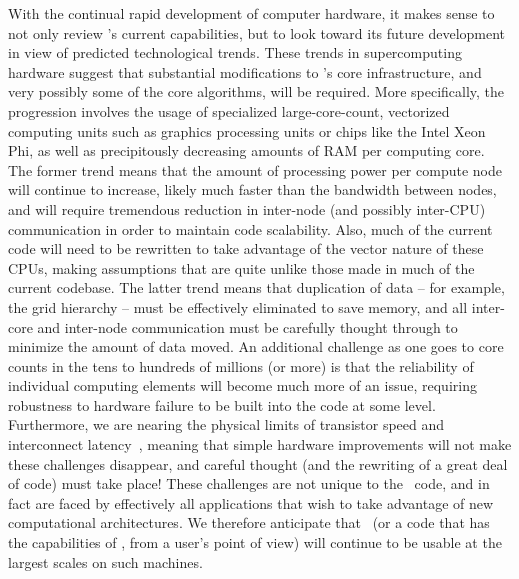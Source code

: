 With the continual rapid development of computer hardware, it makes
sense to not only review \enzo's current capabilities, but to look
toward its future development in view of predicted technological
trends. These trends in supercomputing hardware suggest that
substantial modifications to \enzo's core infrastructure, and very
possibly some of the core algorithms, will be required. More
specifically, the progression involves the usage of specialized
large-core-count, vectorized computing units such as graphics
processing units or chips like the Intel Xeon Phi, as well as
precipitously decreasing amounts of RAM per computing core.  The
former trend means that the amount of processing power per compute
node will continue to increase, likely much faster than the bandwidth
between nodes, and will require tremendous reduction in inter-node
(and possibly inter-CPU) communication in order to maintain code
scalability.  Also, much of the current code will need to be rewritten
to take advantage of the vector nature of these CPUs, making
assumptions that are quite unlike those made in much of the current
codebase.  The latter trend means that duplication of data -- for
example, the grid hierarchy -- must be effectively eliminated to save
memory, and all inter-core and inter-node communication must be
carefully thought through to minimize the amount of data moved.  An
additional challenge as one goes to core counts in the tens to
hundreds of millions (or more) is that the reliability of individual
computing elements will become much more of an issue, requiring
robustness to hardware failure to be built into the code at some
level.  Furthermore, we are nearing the physical limits of transistor
speed and interconnect latency~\citep{feynman1999feynman}, meaning
that simple hardware improvements will not make these challenges
disappear, and careful thought (and the rewriting of a great deal of
code) must take place!  These challenges are not unique to the \enzo\
code, and in fact are faced by effectively all applications that wish
to take advantage of new computational architectures. We therefore
anticipate that \enzo\ (or a code that has the capabilities of \enzo,
from a user's point of view) will continue to be usable at the largest
scales on such machines.


